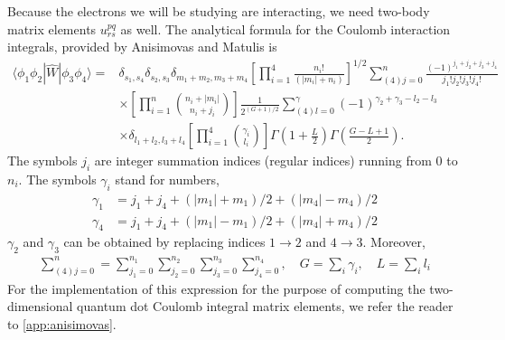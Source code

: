 Because the electrons we will be studying are interacting, we need
two-body matrix elements $u^{pq}_{rs}$
as well. The analytical formula for the Coulomb interaction integrals, provided by Anisimovas and 
Matulis\cite{anisimovas1998energy} is
\begin{equation}
    \begin{aligned}
        \langle \phi_1\phi_2| \hat{W} | \phi_3\phi_4 \rangle =& 
        \delta_{s_1, s_4} \delta_{s_2, s_3} \delta_{m_1 + m_2, m_3 + m_4}
        \left[\prod_{i=1}^4 \frac{n_i!}{(|m_i| + n_i)} \right]^{1/2}
        \sum_{(4)j=0}^n \frac{(-1)^{j_1+j_2+j_3+j_4}}{j_1!j_2!j_3!j_4!} \\
        &\times \left[\prod_{i=1}^n \binom{n_i + |m_i|} {n_i + j_i} \right]
        \frac{1}{2^{(G+1)/2}} \sum_{(4)l=0}^\gamma (-1)^{\gamma_2 + \gamma_3 - l_2 - l_3} \\
        &\times \delta_{l_1 + l_2, l_3 + l_4} \left[\prod_{i=1}^4 \binom{\gamma_i}{l_i} \right] 
        \Gamma\left(1 + \frac{L}{2} \right)\Gamma\left(\frac{G - L + 1}{2}\right).
    \end{aligned}
\end{equation}
The symbols $j_i$ are integer summation indices (regular indices) running from $0$ to $n_i$.
The symbols $\gamma_i$ stand for numbers,
\begin{align*}
\gamma_1 &= j_1 + j_4 + (|m_1| + m_1)/2 + (|m_4| - m_4)/2 \\
\gamma_4 &= j_1 + j_4 + (|m_1| - m_1)/2 + (|m_4| + m_4)/2
\end{align*}
$\gamma_2$ and $\gamma_3$ can be obtained by replacing indices $1 \to 2$ and $4 \to 3$.
Moreover,
\begin{align*}
\sum_{(4)j=0}^n =
\sum_{j_1=0}^{n_1}\sum_{j_2=0}^{n_2}\sum_{j_3=0}^{n_3}\sum_{j_4=0}^{n_4},
\quad 
G = \sum_i \gamma_i, 
\quad
L = \sum_i l_i
\end{align*}
For the implementation of this expression for the purpose of computing the two-dimensional 
quantum dot Coulomb integral matrix elements, we refer the reader to \autoref{app:anisimovas}.

